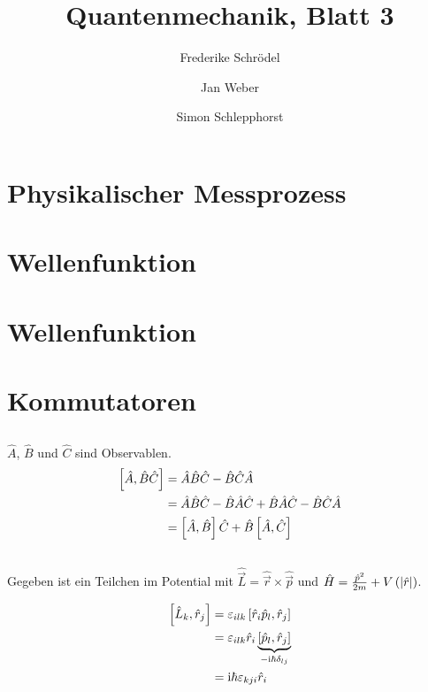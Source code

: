 \documentclass[11pt, ngerman, fleqn, DIV=15, headinclude]{scrartcl}
\title{Quantenmechanik, Blatt 3}
\author{
    Frederike Schrödel \and Jan Weber \and Simon Schlepphorst
}
\begin{document}
\maketitle

\section{Physikalischer Messprozess}



\section{Wellenfunktion}

\section{Wellenfunktion}

\section{Kommutatoren}
\subsection{ }
$\hat A$, $\hat B$ und $\hat C$ sind Observablen.
\begin{align*}
	\left[ \hat A, \hat B \hat C \right]
	&= \hat A \hat B \hat C - \hat B \hat C \hat A \\
	&= \hat A \hat B \hat C - \hat B \hat A \hat C + \hat B \hat A \hat C -
	\hat B \hat C \hat A\\
	&= \left[ \hat A,\hat B \right] \hat C + \hat B \left[ \hat A, \hat C \right]
\end{align*}

\subsection{ }
Gegeben ist ein Teilchen im Potential mit $\hat {\vec L} = \hat {\vec r} \times
\hat {\vec p}$ und $\hat H = \frac{\hat p^2}{2m} + V\left( \left| \hat r \right| \right)$.

\begin{align*}
	\left[ \hat L_k, \hat r_j \right]
	&= \varepsilon_{ilk} \left[ \hat r_i \hat p_l, \hat r_j \right]\\
	&= \varepsilon_{ilk} \hat r_i \underbrace{\left[ \hat p_l, \hat r_j \right]}_{-\mathrm i\hbar
		\delta_{lj}}\\
		&= \mathrm i\hbar \varepsilon_{kji} \hat r_i \\
\end{align*}
\end{document}

